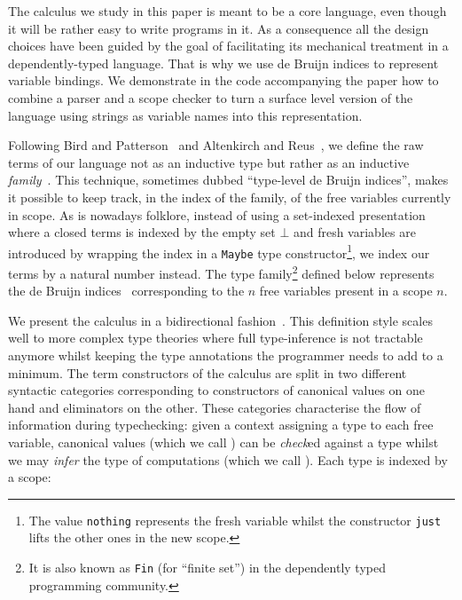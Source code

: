 \documentclass[a4paper,UKenglish]{lipics-v2016}
\begin{document}
The calculus we study in this paper is meant to be a core language,
even though it will be rather easy to write programs in it. As a
consequence all the design choices have been guided by the goal
of facilitating its mechanical treatment in a dependently-typed language.
That is why we use de Bruijn indices to represent variable bindings.
We demonstrate in the code accompanying the paper how to combine a
parser and a scope checker to turn a surface level version of the
language using strings as variable names into this representation.

Following Bird and Patterson~\cite{bird_paterson_1999} and Altenkirch and Reus~\cite{altenkirch1999monadic},
we define the raw terms of our language not as an inductive
type but rather as an inductive \emph{family}~\cite{dybjer1994inductive}.
This technique, sometimes dubbed ``type-level de Bruijn indices'',
makes it possible to keep track, in the index of the family, of the
free variables currently in scope. As is nowadays folklore, instead of
using a set-indexed presentation where a closed terms is indexed by
the empty set $⊥$ and fresh variables are introduced by wrapping
the index in a \texttt{Maybe} type constructor\footnote{The value
\texttt{nothing} represents the fresh variable whilst the constructor
\texttt{just} lifts the other ones in the new scope.}, we index
our terms by a natural number instead. The
\Var{} type family\footnote{It is also known as \texttt{Fin} (for
``finite set'') in the dependently typed programming community.}
defined below represents the de Bruijn indices~\cite{debruijn1972lambda}
corresponding to the $n$ free variables present in a scope $n$.


We present the calculus in a bidirectional fashion~\cite{pierce2000local}.
This definition style scales well to more complex type theories where full
type-inference is not tractable anymore whilst keeping the type annotations
the programmer needs to add to a minimum. The term constructors of the calculus
are split in two different syntactic categories corresponding to constructors
of canonical values on one hand and eliminators on the other. These categories
characterise the flow of information during typechecking: given a context
assigning a type to each free variable, canonical values (which we call \Checkable{})
can be \emph{check}ed against a type whilst we may \emph{infer} the type of
computations (which we call \Inferable{}). Each type is indexed by a scope:
\end{document}
